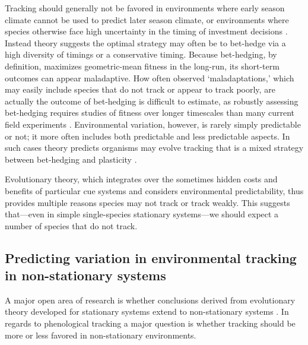 \documentclass[11pt,letterpaper]{article}
\newcommand{\R}[1]{\label{}\linelabel{#1}}
\begin{document}

Tracking should generally not be favored in environments \R{r2unpredict}where early season climate cannot be used to predict later season climate, or environments where species otherwise face high uncertainty in the timing of investment decisions \citep{Gavrilets1993}. Instead theory suggests the optimal strategy may often be to bet-hedge \citep{Venable:2007os,donald2013,decasas2015} via a high diversity of timings or a conservative timing. Because bet-hedging, by definition, maximizes geometric-mean fitness in the long-run, its short-term outcomes can appear maladaptive. How often observed `maladaptations,' which may easily include species that do not track or appear to track poorly, are actually the outcome of bet-hedging is difficult to estimate, as robustly assessing bet-hedging requires studies of fitness over longer timescales than many current field experiments \citep{simons2011}. Environmental variation, however, is rarely simply predictable or not; it more often includes both predictable and less predictable aspects. In such cases theory predicts organisms may evolve tracking that is a mixed strategy between bet-hedging and plasticity \citep{wong2005}. 

Evolutionary theory, which integrates over the sometimes hidden costs and benefits of particular cue systems and considers environmental predictability, thus provides multiple reasons species may not track or track weakly. This suggests that---even in simple single-species stationary systems---we should expect a number of species that do not track.

\subsection{Predicting variation in environmental tracking in non-stationary systems}
A major open area of research is whether conclusions derived from evolutionary theory developed for stationary systems extend to non-stationary systems \citep{chevin2010}. In regards to phenological tracking a major question is whether tracking should be more or less favored in non-stationary environments. 
\end{document}
